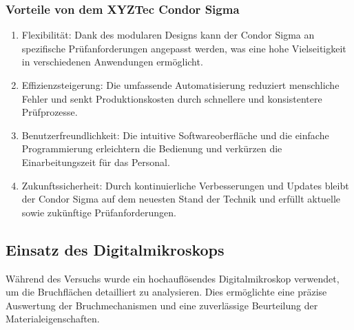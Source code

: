 \subsubsection{Vorteile von dem XYZTec Condor Sigma}
\begin{enumerate}
    \item Flexibilität: Dank des modularen Designs kann der Condor Sigma an spezifische Prüfanforderungen angepasst werden, was eine hohe Vielseitigkeit in verschiedenen Anwendungen ermöglicht.
    \item Effizienzsteigerung: Die umfassende Automatisierung reduziert menschliche Fehler und senkt Produktionskosten durch schnellere und konsistentere Prüfprozesse.
    \item Benutzerfreundlichkeit: Die intuitive Softwareoberfläche und die einfache Programmierung erleichtern die Bedienung und verkürzen die Einarbeitungszeit für das Personal.
    \item Zukunftssicherheit: Durch kontinuierliche Verbesserungen und Updates bleibt der Condor Sigma auf dem neuesten Stand der Technik und erfüllt aktuelle sowie zukünftige Prüfanforderungen.
\end{enumerate}
\subsection{Einsatz des Digitalmikroskops}
Während des Versuchs wurde ein hochauflösendes Digitalmikroskop verwendet, um die Bruchflächen detailliert zu analysieren. Dies ermöglichte eine präzise Auswertung der Bruchmechanismen und eine zuverlässige Beurteilung der Materialeigenschaften.
